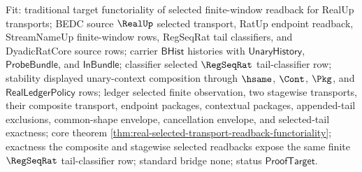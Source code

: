 Fit: traditional target functoriality of selected finite-window readback for
RealUp transports; BEDC source $\RealUp$ selected transport, RatUp endpoint
readback, StreamNameUp finite-window rows, RegSeqRat tail classifiers, and
DyadicRatCore source rows; carrier $\mathsf{BHist}$ histories with
$\mathsf{UnaryHistory}$, $\mathsf{ProbeBundle}$, and $\mathsf{InBundle}$;
classifier selected $\RegSeqRat$ tail-classifier row; stability displayed
unary-context composition through $\hsame$, $\Cont$, $\Pkg$, and
$\mathsf{RealLedgerPolicy}$ rows; ledger selected finite observation, two
stagewise transports, their composite transport, endpoint packages, contextual
packages, appended-tail exclusions, common-shape envelope, cancellation
envelope, and selected-tail exactness; core theorem
\autoref{thm:real-selected-transport-readback-functoriality}; exactness the
composite and stagewise selected readbacks expose the same finite
$\RegSeqRat$ tail-classifier row; standard bridge none; status
$\mathsf{ProofTarget}$.
